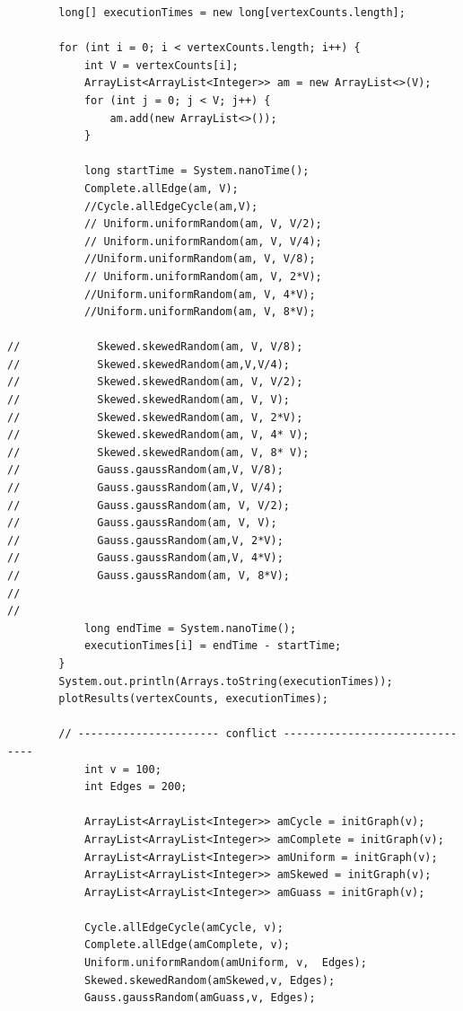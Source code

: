 \documentclass{article}
\begin{document}
\begin{verbatim}
        long[] executionTimes = new long[vertexCounts.length];

        for (int i = 0; i < vertexCounts.length; i++) {
            int V = vertexCounts[i];
            ArrayList<ArrayList<Integer>> am = new ArrayList<>(V);
            for (int j = 0; j < V; j++) {
                am.add(new ArrayList<>());
            }

            long startTime = System.nanoTime();
            Complete.allEdge(am, V);
            //Cycle.allEdgeCycle(am,V);
            // Uniform.uniformRandom(am, V, V/2);
            // Uniform.uniformRandom(am, V, V/4);
            //Uniform.uniformRandom(am, V, V/8);
            // Uniform.uniformRandom(am, V, 2*V);
            //Uniform.uniformRandom(am, V, 4*V);
            //Uniform.uniformRandom(am, V, 8*V);

//            Skewed.skewedRandom(am, V, V/8);
//            Skewed.skewedRandom(am,V,V/4);
//            Skewed.skewedRandom(am, V, V/2);
//            Skewed.skewedRandom(am, V, V);
//            Skewed.skewedRandom(am, V, 2*V);
//            Skewed.skewedRandom(am, V, 4* V);
//            Skewed.skewedRandom(am, V, 8* V);
//            Gauss.gaussRandom(am,V, V/8);
//            Gauss.gaussRandom(am,V, V/4);
//            Gauss.gaussRandom(am, V, V/2);
//            Gauss.gaussRandom(am, V, V);
//            Gauss.gaussRandom(am,V, 2*V);
//            Gauss.gaussRandom(am,V, 4*V);
//            Gauss.gaussRandom(am, V, 8*V);
//
//
            long endTime = System.nanoTime();
            executionTimes[i] = endTime - startTime;
        }
        System.out.println(Arrays.toString(executionTimes));
        plotResults(vertexCounts, executionTimes);

        // ---------------------- conflict -------------------------------
            int v = 100;
            int Edges = 200;

            ArrayList<ArrayList<Integer>> amCycle = initGraph(v);
            ArrayList<ArrayList<Integer>> amComplete = initGraph(v);
            ArrayList<ArrayList<Integer>> amUniform = initGraph(v);
            ArrayList<ArrayList<Integer>> amSkewed = initGraph(v);
            ArrayList<ArrayList<Integer>> amGuass = initGraph(v);

            Cycle.allEdgeCycle(amCycle, v);
            Complete.allEdge(amComplete, v);
            Uniform.uniformRandom(amUniform, v,  Edges);
            Skewed.skewedRandom(amSkewed,v, Edges);
            Gauss.gaussRandom(amGuass,v, Edges);


\end{verbatim}
\end{document}
